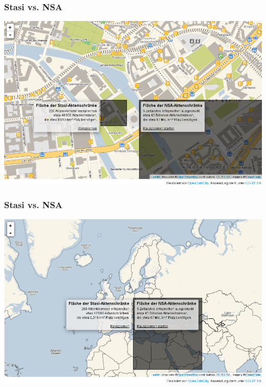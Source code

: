 \documentclass[12pt]{beamer}
\begin{document}
\begin{frame}
    \frametitle{Stasi vs. NSA}
    \begin{center}
	\includegraphics[height=0.7\textheight]{img/akten1.png}
    \end{center}
\end{frame}

\begin{frame}
    \frametitle{Stasi vs. NSA}
    \begin{center}
	\includegraphics[height=0.7\textheight]{img/akten2.png}
    \end{center}
\end{frame}
\end{document}

